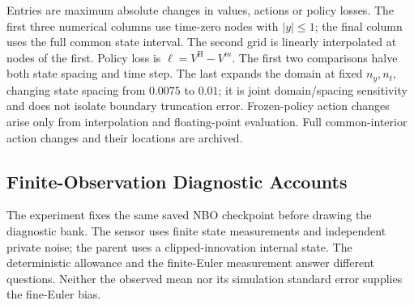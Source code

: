 \begin{table}[!htbp]
\begin{minipage}{0.97\textwidth}\footnotesize
Entries are maximum absolute changes in values, actions or policy losses. The first three numerical columns use time-zero nodes with $|y|\le1$; the final column uses the full common state interval. The second grid is linearly interpolated at nodes of the first. Policy loss is $\ell=V^{\mathrm H}-V^m$. The first two comparisons halve both state spacing and time step. The last expands the domain at fixed $n_y,n_t$, changing state spacing from $0.0075$ to $0.01$; it is joint domain/spacing sensitivity and does not isolate boundary truncation error. Frozen-policy action changes arise only from interpolation and floating-point evaluation. Full common-interior action changes and their locations are archived.
\end{minipage}
\end{table}


\clearpage
\subsection{Finite-Observation Diagnostic Accounts}\label{app:r14sensingdiagnostics}
The experiment fixes the same saved NBO checkpoint before drawing the diagnostic bank. The sensor uses finite state measurements and independent private noise; the parent uses a clipped-innovation internal state. The deterministic allowance and the finite-Euler measurement answer different questions. Neither the observed mean nor its simulation standard error supplies the fine-Euler bias.

